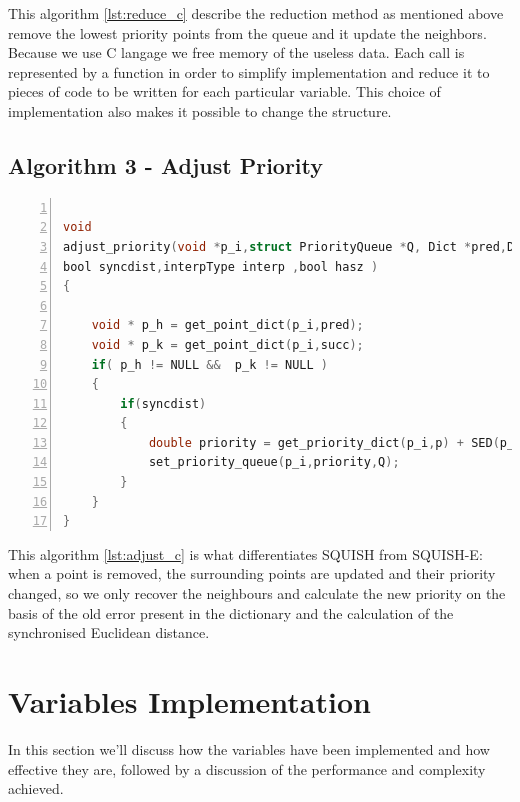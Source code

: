 This algorithm \ref{lst:reduce_c} describe the reduction method as mentioned above remove the lowest priority points from the queue and it update the neighbors. Because we use C langage we free memory of the useless data. Each call is represented by a function in order to simplify implementation and reduce it to pieces of code to be written for each particular variable. This choice of implementation also makes it possible to change the structure. 

\subsection{Algorithm 3 - Adjust Priority} 

\begin{minipage}{\linewidth}
\begin{lstlisting}[language=C, % Spécifie le langage du code
caption={adjust\_priority}, % Légende du listing
label=lst:adjust_c, % Étiquette pour référencer le listing
numbers=left,
numberstyle=\tiny\color{gray},
stepnumber=1,
frame=single,
breaklines=true,
postbreak=\mbox{\textcolor{red}{$\hookrightarrow$}\space},
showstringspaces=false
]

void
adjust_priority(void *p_i,struct PriorityQueue *Q, Dict *pred,Dict *succ,PDict  *p,
bool syncdist,interpType interp ,bool hasz )
{

	void * p_h = get_point_dict(p_i,pred);
	void * p_k = get_point_dict(p_i,succ);
	if( p_h != NULL &&  p_k != NULL )
	{
		if(syncdist)
		{
			double priority = get_priority_dict(p_i,p) + SED(p_h,p_i,p_k, interp , hasz );
			set_priority_queue(p_i,priority,Q);
		}
	}
}

\end{lstlisting}
 
\end{minipage}
\vspace{1cm}

This algorithm \ref{lst:adjust_c} is what differentiates SQUISH from SQUISH-E: when a point is removed, the surrounding points are updated and their priority changed, so we only recover the neighbours and calculate the new priority on the basis of the old error present in the dictionary and the calculation of the synchronised Euclidean distance. 


\section{Variables Implementation}
In this section we'll discuss how the variables have been implemented and how effective they are, followed by a discussion of the performance and complexity achieved.


